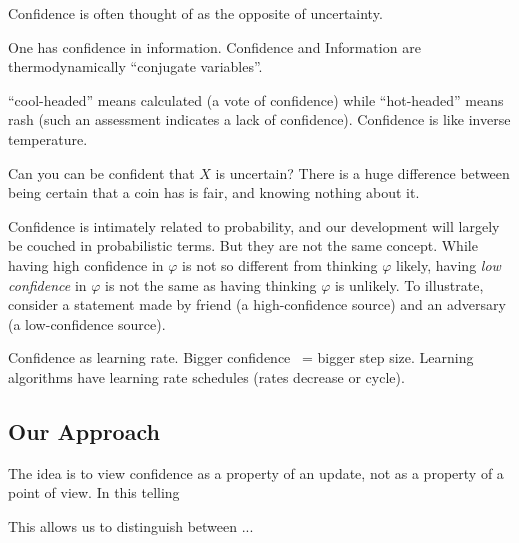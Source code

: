 \documentclass{article}
\begin{document}
Confidence is often thought of as the opposite of uncertainty.


One has confidence in information.
Confidence and Information are thermodynamically ``conjugate variables''.


``cool-headed'' means calculated (a vote of confidence) while ``hot-headed'' means rash (such an assessment indicates a lack of confidence). Confidence is like inverse temperature.

Can you can be confident that $X$ is uncertain?
There is a huge difference between being certain that a coin has is fair, and knowing nothing about it.



Confidence is intimately related to probability, and our development will largely be couched in probabilistic terms. But they are not the same concept. 
While having high confidence in $\varphi$ is not so different from thinking $\varphi$ likely, having \emph{low confidence} in $\varphi$ is not the same as having thinking $\varphi$ is unlikely.
To illustrate, consider a statement made by friend (a high-confidence source) and an adversary (a low-confidence source). 
 


Confidence as learning rate. Bigger confidence ~= bigger step size.
Learning algorithms have learning rate schedules (rates decrease or cycle).  

\subsection*{Our Approach}
The idea is to view confidence as a property of an update, not as a property of a point of view.
In this telling

This allows us to distinguish between ...
%

%
%
\end{document}
